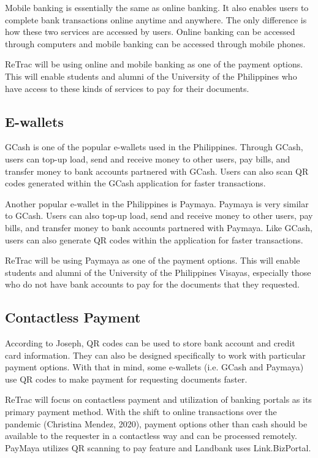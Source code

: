 Mobile banking is essentially the same as online banking. It also enables users to complete bank transactions online anytime and anywhere. The only difference is how these two services are accessed by users. Online banking can be accessed through computers and mobile banking can be accessed through mobile phones. 
	
ReTrac will be using online and mobile banking as one of the payment options. This will enable students and alumni of the University of the Philippines who have access to these kinds of services to pay for their documents.

\subsection{E-wallets}
GCash is one of the popular e-wallets used in the Philippines. Through GCash, users can top-up load, send and receive money to other users, pay bills, and transfer money to bank accounts partnered with GCash. Users can also scan QR codes generated within the GCash application for faster transactions.

Another popular e-wallet in the Philippines is Paymaya. Paymaya is very similar to GCash. Users can also top-up load, send and receive money to other users, pay bills, and transfer money to bank accounts partnered with Paymaya. Like GCash, users can also generate QR codes within the application for faster transactions. 

ReTrac will be using Paymaya as one of the payment options. This will enable students and alumni of the University of the Philippines Visayas, especially those who do not have bank accounts to pay for the documents that they requested. 

\subsection{Contactless Payment}
According to Joseph, QR codes can be used to store bank account and credit card information. They can also be designed specifically to work with particular payment options. With that in mind, some e-wallets (i.e. GCash and Paymaya) use QR codes to make payment for requesting documents faster. 

ReTrac will focus on contactless payment and utilization of banking portals as its primary payment method. With the shift to online transactions over the pandemic (Christina Mendez, 2020), payment options other than cash should be available to the requester in a contactless way and can be processed remotely. PayMaya utilizes QR scanning to pay feature and Landbank uses Link.BizPortal.




